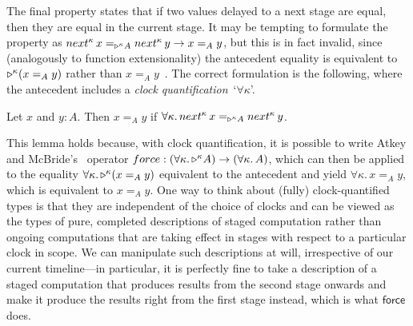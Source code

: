 \documentclass[a4paper,UKenglish,numberwithinsect,cleveref,thm-restate,draft]{lipics-v2021}
\numberwithin{equation}{section}
\theoremstyle{definition}
\theoremstyle{plain}
\begin{document}
The final property states that if two values delayed to a next stage are equal, then they are equal in the current stage.
It may be tempting to formulate the property as $\mathsf{next}^\kappa\, x =_{\laterp^\kappa A} \mathsf{next}^\kappa\, y \to x =_A y$, but this is in fact invalid, since (analogously to function extensionality) the antecedent equality is equivalent to $\mathord{\triangleright}^\kappa (x =_A y)$ rather than $x =_A y$~\cite{Mogelberg2019a}.
The correct formulation is the following, where the antecedent includes a \emph{clock quantification}~`$\forall\kappa$'.
\begin{lemma}\label{lem:later-identity}
  Let $x$ and $y : A$. Then $x =_A y$ if\/ $\forall \kappa.\, \mathsf{next}^\kappa\,x =_{\laterp^\kappa A} \mathsf{next}^\kappa\,y$.
\end{lemma}
This lemma holds because, with clock quantification, it is possible to write Atkey and McBride's~\cite{Atkey2013b} operator $\mathsf{force} : (\forall\kappa.\, \laterp^\kappa A) \to (\forall\kappa.\, A)$, which can then be applied to the equality $\forall\kappa.\, \mathord{\triangleright}^\kappa (x =_A y)$ equivalent to the antecedent and yield $\forall\kappa.\, x =_A y$, which is equivalent to $x =_A y$.
One way to think about (fully) clock-quantified types is that they are independent of the choice of clocks and can be viewed as the types of pure, completed descriptions of staged computation rather than ongoing computations that are taking effect in stages with respect to a particular clock in scope.
We can manipulate such descriptions at will, irrespective of our current timeline---in particular, it is perfectly fine to take a description of a staged computation that produces results from the second stage onwards and make it produce the results right from the first stage instead, which is what $\mathsf{force}$ does.

\end{document}
